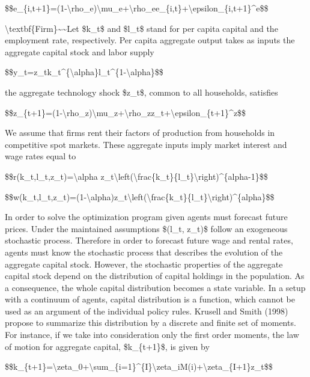 \documentclass[10pt,math=newtx,citestyle=gb7714-2015,bibstyle=gb7714-2015]{elegantbook}
\begin{document}
	\$\$e\_\{i,t+1\}=(1-\textbackslash{}rho\_e)\textbackslash{}mu\_e+\textbackslash{}rho\_ee\_\{i,t\}+\textbackslash{}epsilon\_\{i,t+1\}\^{}e\$\$
	
	\textbackslash{}textbf\{Firm\}\~{}\~{}Let \$k\_t\$ and \$l\_t\$ stand for per capita capital and the employment rate, respectively. Per capita aggregate output takes as inputs the aggregate capital stock and labor supply
	
	\$\$y\_t=z\_tk\_t\^{}\{\textbackslash{}alpha\}l\_t\^{}\{1-\textbackslash{}alpha\}\$\$
	
	the aggregate technology shock \$z\_t\$, common to all households, satisfies
	
	\$\$z\_\{t+1\}=(1-\textbackslash{}rho\_z)\textbackslash{}mu\_z+\textbackslash{}rho\_zz\_t+\textbackslash{}epsilon\_\{t+1\}\^{}z\$\$
	
	We assume that firms rent their factors of production from households in competitive spot markets. These aggregate inputs imply market interest and wage rates equal to
	
	\$\$r(k\_t,l\_t,z\_t)=\textbackslash{}alpha z\_t\textbackslash{}left(\textbackslash{}frac\{k\_t\}\{l\_t\}\textbackslash{}right)\^{}\{alpha-1\}\$\$
	
	\$\$w(k\_t,l\_t,z\_t)=(1-\textbackslash{}alpha)z\_t\textbackslash{}left(\textbackslash{}frac\{k\_t\}\{l\_t\}\textbackslash{}right)\^{}\{alpha\}\$\$
	
	In order to solve the optimization program given agents must forecast future prices. Under the maintained assumptions \$(l\_t, z\_t)\$ follow an exogeneous stochastic process. Therefore in order to forecast future wage and rental rates, agents must know the stochastic process that describes the evolution of the aggregate capital stock. However, the stochastic properties of the aggregate capital stock depend on the distribution of capital holdings in the population. As a consequence, the whole capital distribution becomes a state variable. In a setup with a continuum of agents, capital distribution is a function, which cannot be used as an argument of the individual policy rules. Krusell and Smith (1998) propose to summarize this
	distribution by a discrete and finite set of moments. For instance, if we take into consideration only the first order moments, the law of motion for aggregate capital, \$k\_\{t+1\}\$, is given by
	
	\$\$k\_\{t+1\}=\textbackslash{}zeta\_0+\textbackslash{}sum\_\{i=1\}\^{}\{I\}\textbackslash{}zeta\_iM(i)+\textbackslash{}zeta\_\{I+1\}z\_t\$\$
	
\end{document}

